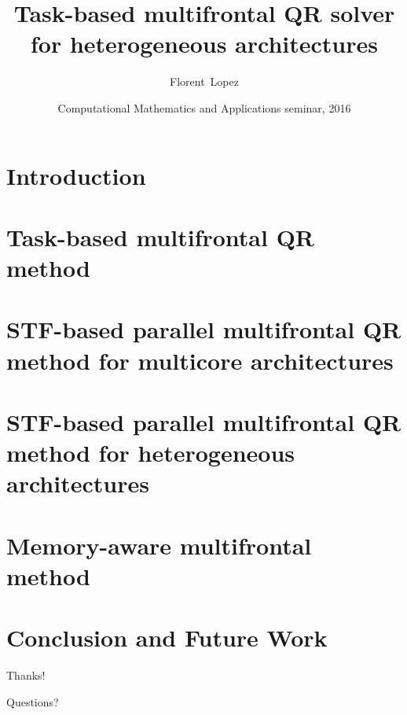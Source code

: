 \documentclass{beamer}
\author{Florent~Lopez}
\institute{STFC Rutherford Appleton Laboratory}
\title{Task-based multifrontal QR solver for heterogeneous
  architectures}
\date{Computational Mathematics and Applications seminar, 2016}
\begin{document}
\nocite{a.b.g.l.:15,a.b.g.l.:14,a.b.g.l.:13,s.a.b.g.ea:15,a.a.b.b.ea:15,a.b.g.l:15*1,a.b.g.l:15*2,a.b.g.l:14*1,a.b.g.l:13*1,d.l:12}
\nocite{a.b.c.d.ea:14, e.m.s.v:15}

\begin{frame}[t,plain]
\titlepage

\end{frame}

\section{Introduction}

% 
\section{Task-based multifrontal QR method}

\section{STF-based parallel multifrontal QR method for multicore architectures}

\section{STF-based parallel multifrontal QR method for heterogeneous architectures}

\section{Memory-aware multifrontal method}

\section{Conclusion and Future Work}



\begin{frame}[plain]{}
  \begin{center}
    \vspace{2cm}

    {\Huge Thanks!}

    \vspace{1cm}

    {\huge Questions?}

    \vspace{2cm}

  \end{center}
\end{frame}
\end{document}
